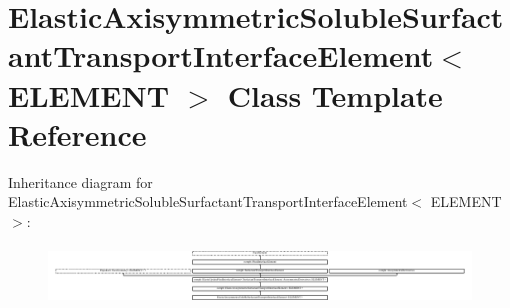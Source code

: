 \hypertarget{classElasticAxisymmetricSolubleSurfactantTransportInterfaceElement}{}\section{Elastic\+Axisymmetric\+Soluble\+Surfactant\+Transport\+Interface\+Element$<$ E\+L\+E\+M\+E\+NT $>$ Class Template Reference}
\label{classElasticAxisymmetricSolubleSurfactantTransportInterfaceElement}
Inheritance diagram for Elastic\+Axisymmetric\+Soluble\+Surfactant\+Transport\+Interface\+Element$<$ E\+L\+E\+M\+E\+NT $>$\+:\begin{figure}[H]
\begin{center}
\leavevmode
\includegraphics[height=1.588653cm]{classElasticAxisymmetricSolubleSurfactantTransportInterfaceElement}
\end{center}
\end{figure}
